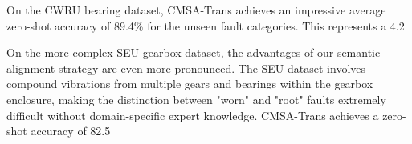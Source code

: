 On the CWRU bearing dataset, CMSA-Trans achieves an impressive average zero-shot accuracy of 89.4\% for the unseen fault categories. This represents a 4.2%

On the more complex SEU gearbox dataset, the advantages of our semantic alignment strategy are even more pronounced. The SEU dataset involves compound vibrations from multiple gears and bearings within the gearbox enclosure, making the distinction between "worn" and "root" faults extremely difficult without domain-specific expert knowledge. CMSA-Trans achieves a zero-shot accuracy of 82.5%

